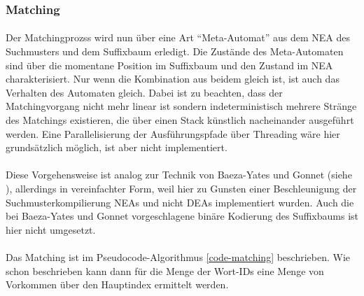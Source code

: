 \subsubsection{Matching}

\paragraph{} Der Matchingprozss wird nun über eine Art "`Meta-Automat"' aus dem NEA des Suchmusters und dem Suffixbaum erledigt. Die Zustände des Meta-Automa\-ten sind über die momentane Position im Suffixbaum und den Zustand im NEA charakterisiert. Nur wenn die Kombination aus beidem gleich ist, ist auch das Verhalten des Automaten gleich. Dabei ist zu beachten, dass der Matchingvorgang nicht mehr linear ist sondern indeterministisch mehrere Stränge des Matchings existieren, die über einen Stack künstlich nacheinander ausgeführt werden. Eine Parallelisierung der Ausführungspfade über Threading wäre hier grundsätzlich möglich, ist aber nicht implementiert.
\paragraph{} Diese Vorgehensweise ist analog zur Technik von Baeza-Yates und Gonnet (siehe \cite{baeza-yates}), allerdings in vereinfachter Form, weil hier zu Gunsten einer Beschleunigung der Suchmusterkompilierung NEAs und nicht DEAs implementiert wurden. Auch die bei Baeza-Yates und Gonnet vorgeschlagene binäre Kodierung des Suffixbaums ist hier nicht umgesetzt.
\paragraph{} Das Matching ist im Pseudocode-Algorithmus \ref{code-matching} beschrieben. Wie schon beschrieben kann dann für die Menge der Wort-IDs eine Menge von Vorkommen über den Hauptindex ermittelt werden.

